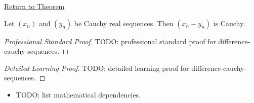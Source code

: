 \newpage
{}
\label{prf:difference-cauchy-sequences}

\begin{remark*}[Return]
\hyperref[thm:difference-cauchy-sequences]{Return to Theorem}
\end{remark*}

\begin{theorem*}
Let $(x_n)$ and $(y_n)$ be Cauchy real sequences. Then $(x_n-y_n)$ is
Cauchy.

\smallskip
\noindent
\end{theorem*}

\begin{proof}[Professional Standard Proof]
\LRAProofBodyStart
TODO: professional standard proof for difference-cauchy-sequences.
\end{proof}

\begin{proof}[Detailed Learning Proof]
\LRAProofBodyStart
TODO: detailed learning proof for difference-cauchy-sequences.
\end{proof}

\begin{remark*}
\end{remark*}

\begin{dependencies}
\begin{itemize}
  \item TODO: list mathematical dependencies.
\end{itemize}
\end{dependencies}

\clearpage
